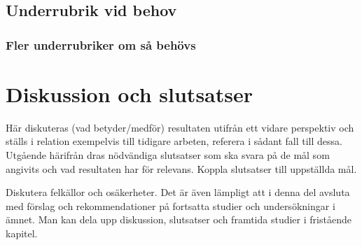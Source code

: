 \documentclass[a4paper]{article}
\begin{document}
\subsection{Underrubrik vid behov}

\subsubsection{Fler underrubriker om så behövs}





\section{Diskussion och slutsatser}


Här diskuteras (vad betyder/medför) resultaten utifrån ett vidare perspektiv och ställs i relation exempelvis till tidigare arbeten, referera i sådant fall till dessa. Utgående härifrån dras nödvändiga slutsatser som ska svara på de mål som angivits och vad resultaten har för relevans. Koppla slutsatser till uppställda mål.

Diskutera felkällor och osäkerheter.
Det är även lämpligt att i denna del avsluta med förslag och rekommendationer på fortsatta studier och undersökningar i ämnet. Man kan dela upp diskussion, slutsatser och framtida studier i fristående kapitel.




\printbibliography %
\end{document}
